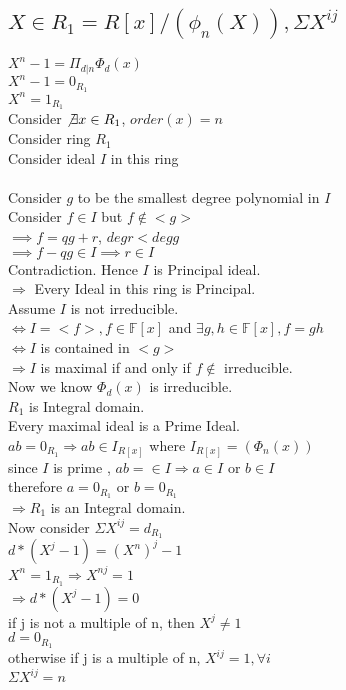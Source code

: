 \documentclass{article}
\begin{document}
\subsection{$X \in R_1 = R[x]/(\phi_n(X)), \Sigma X^{ij} $}
$X^n - 1 = \Pi_{d|n} \Phi_d(x)$
\\ $X^n - 1 = 0_{R_1}$
\\ $X^n = 1_{R_1}$
\\ Consider $ \not \exists x \in R_1 $, $order(x) = n$
\\ Consider ring $R_1$
\\ Consider ideal $I$ in this ring
\\ 
\\  Consider $g$ to be the smallest degree polynomial in $I$
\\ Consider $f \in I$ but $f \not \in <g>$
\\ $\implies f = qg+ r$, $degr < degg$
\\ $\implies f-qg \in I \implies r \in I$
\\ Contradiction. Hence $I$ is Principal ideal.
\\ $\Rightarrow$ Every Ideal in this ring is Principal.
\\ Assume $I$ is not irreducible.
\\ $\Leftrightarrow I = <f>, f \in \mathbb{F}[x]$ and $\exists g,h \in \mathbb{F}[x], f = gh$
\\ $\Leftrightarrow I$ is contained in $<g>$
\\ $\Rightarrow I $ is maximal if and only if $f \not \in$ irreducible.
\\ Now we know $\Phi_d(x)$ is irreducible.
\\  $R_1$ is Integral domain.
\\  Every maximal ideal is a Prime Ideal.
\\ $ab = 0_{R_1} \Rightarrow ab \in I_{R[x]}$ where $I_{R[x]} = (\Phi_n(x))$
\\ since $I$ is prime , $ab = \in I \Rightarrow a \in I$ or $b \in I$
\\ therefore $a = 0_{R_1}$ or $b = 0_{R_1}$
\\ $\Rightarrow R_1 $ is an Integral domain. 
\\ Now consider $\Sigma X^{ij} = d_{R_1}$
\\ $d*(X^j-1) = (X^n)^j - 1$
\\ $X^n = 1_{R_1} \Rightarrow X^{nj} = 1$
\\ $\Rightarrow d*(X^j - 1) = 0$
\\if j is not a multiple of n, then $X^j \neq 1$
\\$d = 0_{R_1}$
\\otherwise if j is a multiple of n, $X^{ij}  = 1, \forall i$
\\$\Sigma X^{ij} = n$
\end{document}
